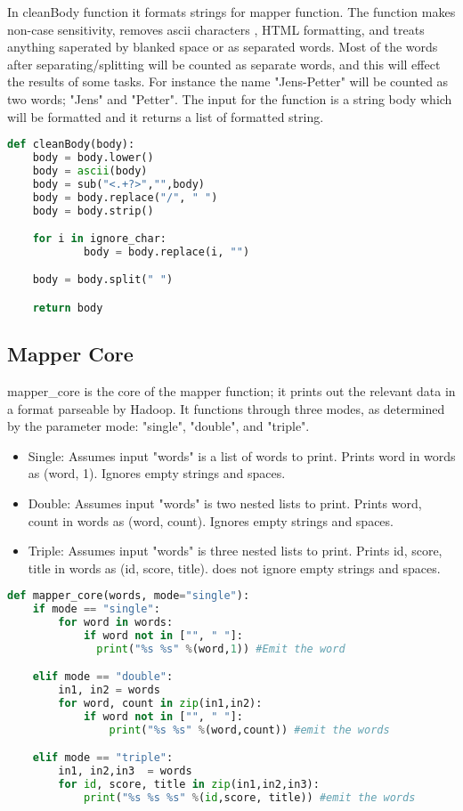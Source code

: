 \documentclass[fleqn,10pt]{wlscirep}
\begin{document}
In cleanBody function it formats strings for mapper function. The function makes non-case sensitivity, removes ascii characters , HTML formatting, and treats anything saperated by blanked space or as separated words. Most of the words after separating/splitting will be counted as separate words, and this will effect the results of some tasks. For instance  the name "Jens-Petter" will be counted as two words; "Jens" and "Petter". The input for the function is a string body which will be formatted and it returns a list of formatted string.

\begin{lstlisting}[language=Python, caption=CleanBody function]
def cleanBody(body):
    body = body.lower()
    body = ascii(body)
    body = sub("<.+?>","",body)
    body = body.replace("/", " ")
    body = body.strip()

    for i in ignore_char:
        	body = body.replace(i, "")

    body = body.split(" ")

    return body
\end{lstlisting}
\subsection*{Mapper Core}
mapper\_core is the core of the mapper function; it prints out the relevant data in a format parseable by Hadoop. It functions through three modes, as determined by the parameter mode: "single", "double", and "triple".

\begin{itemize}
  \item Single: Assumes input "words" is a list of words to print. Prints word in words as (word, 1). Ignores empty strings and spaces.
  \item Double: Assumes input "words" is two nested lists to print. Prints word, count in words as (word, count). Ignores empty strings and spaces.
  \item Triple: Assumes input "words" is three nested lists to print. Prints id, score, title in words as (id, score, title). does not ignore empty strings and spaces.
\end{itemize}

\begin{lstlisting}[language=Python, caption=mapper\_core function]
def mapper_core(words, mode="single"):
    if mode == "single":
        for word in words:
            if word not in ["", " "]:
              print("%s %s" %(word,1)) #Emit the word

    elif mode == "double":
        in1, in2 = words
        for word, count in zip(in1,in2):
            if word not in ["", " "]:
                print("%s %s" %(word,count)) #emit the words

    elif mode == "triple":
        in1, in2,in3  = words
        for id, score, title in zip(in1,in2,in3):
            print("%s %s %s" %(id,score, title)) #emit the words


\end{lstlisting}
\end{document}
